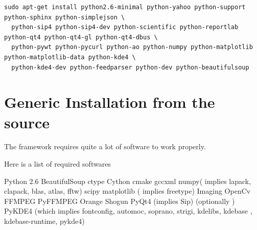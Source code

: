 \documentclass{report}
\begin{document}
\begin{lstlisting}
sudo apt-get install python2.6-minimal python-yahoo python-support python-sphinx python-simplejson \
  python-sip4 python-sip4-dev python-scientific python-reportlab python-qt4 python-qt4-gl python-qt4-dbus \
  python-pywt python-pycurl python-ao python-numpy python-matplotlib python-matplotlib-data python-kde4 \
  python-kde4-dev python-feedparser python-dev python-beautifulsoup

\end{lstlisting}







\section{Generic Installation from the source}
The framework requires quite a lot of software to work properly.

Here is a list of required softwares

 Python 2.6 
 BeautifulSoup 
 ctype 
 Cython  
 cmake 
 gccxml   
 numpy( implies lapack, clapack, blas, atlas, fftw) 
 scipy 
 matplotlib ( implies freetype)
 Imaging 
 OpenCv 
 FFMPEG 
 PyFFMPEG 
 Orange 
 Shogun 
 PyQt4 (implies Sip) 
 (optionally ) PyKDE4 (which implies fontconfig, automoc, soprano, strigi, kdelibs, kdebase , kdebase-runtime, pykde4)
\end{document}
